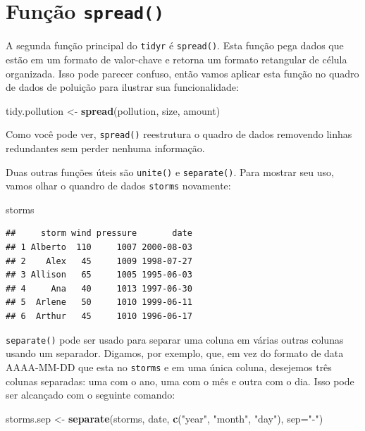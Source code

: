 \documentclass[]{book}
\newenvironment{Shaded}{\begin{snugshade}}{\end{snugshade}}
\newcommand{\DataTypeTok}[1]{\textcolor[rgb]{0.13,0.29,0.53}{#1}}
\newcommand{\KeywordTok}[1]{\textcolor[rgb]{0.13,0.29,0.53}{\textbf{#1}}}
\newcommand{\NormalTok}[1]{#1}
\newcommand{\StringTok}[1]{\textcolor[rgb]{0.31,0.60,0.02}{#1}}
\begin{document}
\hypertarget{funuxe7uxe3o-spread}{%
\section{\texorpdfstring{Função \texttt{spread()}}{Função spread()}}\label{funuxe7uxe3o-spread}}

A segunda função principal do \texttt{tidyr} é \texttt{spread()}. Esta função pega dados que estão em um formato de valor-chave e retorna um formato retangular de célula organizada. Isso pode parecer confuso, então vamos aplicar esta função no quadro de dados de poluição para ilustrar sua funcionalidade:

\begin{Shaded}
\begin{Highlighting}[]
\NormalTok{tidy.pollution <-}\StringTok{ }\KeywordTok{spread}\NormalTok{(pollution, size, amount)}
\end{Highlighting}
\end{Shaded}

Como você pode ver, \texttt{spread()} reestrutura o quadro de dados removendo linhas redundantes sem perder nenhuma informação.

Duas outras funções úteis são \texttt{unite()} e \texttt{separate()}. Para mostrar seu uso, vamos olhar o quandro de dados \texttt{storms} novamente:

\begin{Shaded}
\begin{Highlighting}[]
\NormalTok{storms}
\end{Highlighting}
\end{Shaded}

\begin{verbatim}
##     storm wind pressure       date
## 1 Alberto  110     1007 2000-08-03
## 2    Alex   45     1009 1998-07-27
## 3 Allison   65     1005 1995-06-03
## 4     Ana   40     1013 1997-06-30
## 5  Arlene   50     1010 1999-06-11
## 6  Arthur   45     1010 1996-06-17
\end{verbatim}

\texttt{separate()} pode ser usado para separar uma coluna em várias outras colunas usando um separador. Digamos, por exemplo, que, em vez do formato de data AAAA-MM-DD que esta no \texttt{storms} e em uma única coluna, desejemos três colunas separadas: uma com o ano, uma com o mês e outra com o dia. Isso pode ser alcançado com o seguinte comando:

\begin{Shaded}
\begin{Highlighting}[]
\NormalTok{storms.sep <-}\StringTok{ }\KeywordTok{separate}\NormalTok{(storms, date, }\KeywordTok{c}\NormalTok{(}\StringTok{"year"}\NormalTok{, }\StringTok{"month"}\NormalTok{, }\StringTok{"day"}\NormalTok{), }\DataTypeTok{sep=}\StringTok{"-"}\NormalTok{)}
\end{Highlighting}
\end{Shaded}
\end{document}
